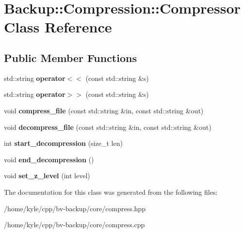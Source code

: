 \hypertarget{class_backup_1_1_compression_1_1_compressor}{}\section{Backup\+:\+:Compression\+:\+:Compressor Class Reference}
\label{class_backup_1_1_compression_1_1_compressor}
\subsection*{Public Member Functions}
\begin{DoxyCompactItemize}
\item 
\mbox{\label{class_backup_1_1_compression_1_1_compressor_a277957091c7b6829c974806fb7da9e0e}} 
std\+::string {\bfseries operator$<$$<$} (const std\+::string \&s)
\item 
\mbox{\label{class_backup_1_1_compression_1_1_compressor_ab10bc34803c735c8907a3338f0e376b9}} 
std\+::string {\bfseries operator$>$$>$} (const std\+::string \&s)
\item 
\mbox{\label{class_backup_1_1_compression_1_1_compressor_a30c7b68f91188ac2fee25144273705c8}} 
void {\bfseries compress\+\_\+file} (const std\+::string \&in, const std\+::string \&out)
\item 
\mbox{\label{class_backup_1_1_compression_1_1_compressor_aaa3defb5a9fb563228cf8c4327e0edf3}} 
void {\bfseries decompress\+\_\+file} (const std\+::string \&in, const std\+::string \&out)
\item 
\mbox{\label{class_backup_1_1_compression_1_1_compressor_ac3aba7a7504c0cc36984bde1a08c3ca4}} 
int {\bfseries start\+\_\+decompression} (size\+\_\+t len)
\item 
\mbox{\label{class_backup_1_1_compression_1_1_compressor_a3b8d31244a69b302da80aaaa42cb755c}} 
void {\bfseries end\+\_\+decompression} ()
\item 
\mbox{\label{class_backup_1_1_compression_1_1_compressor_aceea4cdde4be9e44b2b6e1367045b73c}} 
void {\bfseries set\+\_\+z\+\_\+level} (int level)
\end{DoxyCompactItemize}


The documentation for this class was generated from the following files\+:\begin{DoxyCompactItemize}
\item 
/home/kyle/cpp/bv-\/backup/core/compress.\+hpp\item 
/home/kyle/cpp/bv-\/backup/core/compress.\+cpp\end{DoxyCompactItemize}
